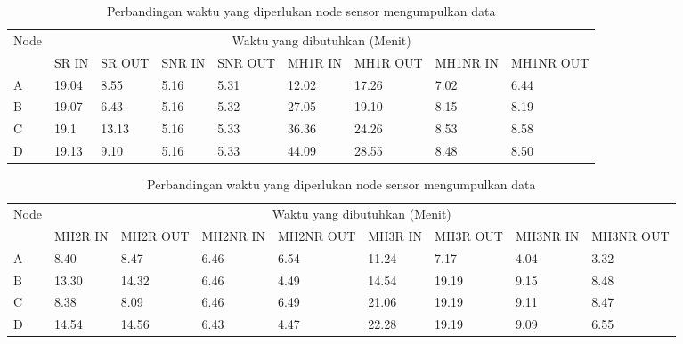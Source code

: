 \begin{table}[H]
  \centering
  \caption{Perbandingan waktu yang diperlukan node sensor mengumpulkan data}
    \begin{tabular}{|p{1.3cm}|p{1.3cm}|p{1.3cm}|p{1.3cm}|p{1.3cm}|p{1.3cm}|p{1.3cm}|p{1.3cm}|p{1.3cm}|}
    \hline
        \multirow{2}{*}{Node}&\multicolumn{8}{|c|}{Waktu yang dibutuhkan (Menit)}\\
        \cline{2-9}
          & SR IN & SR OUT & SNR IN & SNR OUT & MH1R IN & MH1R OUT & MH1NR IN & MH1NR OUT \\
        \hline
        A     & 19.04 & 8.55  & 5.16  & 5.31  & 12.02 & 17.26 & 7.02  & 6.44 \\
    B     & 19.07 & 6.43  & 5.16  & 5.32  & 27.05 & 19.10  & 8.15  & 8.19 \\
    C     & 19.1  & 13.13 & 5.16  & 5.33  & 36.36 & 24.26 & 8.53  & 8.58 \\
    D     & 19.13 & 9.10   & 5.16  & 5.33  & 44.09 & 28.55 & 8.48  & 8.50 \\
    \hline
    \end{tabular}%
  \label{tab:waktu1}%
\end{table}%

\begin{table}[H]
  \centering
  \caption{Perbandingan waktu yang diperlukan node sensor mengumpulkan data}
    \begin{tabular}{|p{1.3cm}|p{1.3cm}|p{1.3cm}|p{1.3cm}|p{1.3cm}|p{1.3cm}|p{1.3cm}|p{1.3cm}|p{1.3cm}|}
    \hline
        \multirow{2}{*}{Node}&\multicolumn{8}{|c|}{Waktu yang dibutuhkan (Menit)}\\
        \cline{2-9}
          & MH2R IN & MH2R OUT & MH2NR IN & MH2NR OUT & MH3R IN & MH3R OUT & MH3NR IN & MH3NR OUT \\
        \hline
    A     & 8.40   & 8.47  & 6.46  & 6.54  & 11.24 & 7.17  & 4.04  & 3.32 \\
    B     & 13.30  & 14.32 & 6.46  & 4.49  & 14.54 & 19.19 & 9.15  & 8.48 \\
    C     & 8.38  & 8.09  & 6.46  & 6.49  & 21.06 & 19.19 & 9.11  & 8.47 \\
    D     & 14.54 & 14.56 & 6.43  & 4.47  & 22.28 & 19.19 & 9.09  & 6.55 \\
    \hline
    \end{tabular}%
  \label{tab:waktu2}%
\end{table}%

